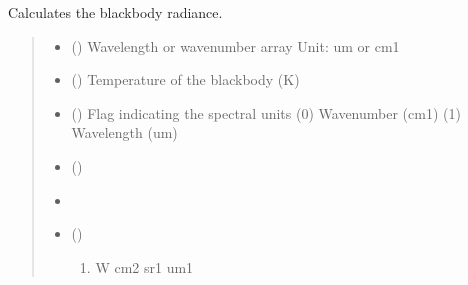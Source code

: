 \documentclass[letterpaper,10pt,english]{sphinxmanual}
\begin{document}

\begin{fulllineitems}
\label{\detokenize{api:nemesispy.calc_planck}}
\pysigstartsignatures
{}
\pysigstopsignatures
\sphinxAtStartPar
Calculates the blackbody radiance.
\begin{quote}\begin{description}
\begin{itemize}
\item {} 
\sphinxAtStartPar
{}\sphinxstyleliteralstrong{\sphinxupquote{(}}\sphinxstyleliteralstrong{\sphinxupquote{)}} () \textendash{} Wavelength or wavenumber array
Unit: um or cm\sphinxhyphen{}1

\item {} 
\sphinxAtStartPar
{} () \textendash{} Temperature of the blackbody (K)

\item {} 
\sphinxAtStartPar
{} () \textendash{} Flag indicating the spectral units
(0) Wavenumber (cm\sphinxhyphen{}1)
(1) Wavelength (um)

\end{itemize}

\sphinxAtStartPar
\begin{itemize}
\item {} 
\sphinxAtStartPar
{} ()

\item {} 
\sphinxAtStartPar
{}

\item {} 
\sphinxAtStartPar
{} () \textendash{}
\begin{enumerate}
%
\item {} 
\sphinxAtStartPar
W cm\sphinxhyphen{}2 sr\sphinxhyphen{}1 um\sphinxhyphen{}1

\end{enumerate}

\end{itemize}


\end{description}\end{quote}

\end{fulllineitems}
\end{document}
